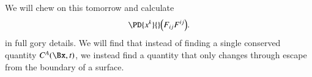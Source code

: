 We will chew on this tomorrow and calculate
%
\begin{equation}\label{eqn:relativisticElectrodynamicsL21b:540}
\PD{x^k}{} \Bigl( F_{i j} F^{i j} \Bigr).
\end{equation}
%
in full gory details.  We will find that instead of finding a single conserved quantity \(C^A(\Bx, t)\), we instead find a quantity that only changes through escape from the boundary of a surface.
